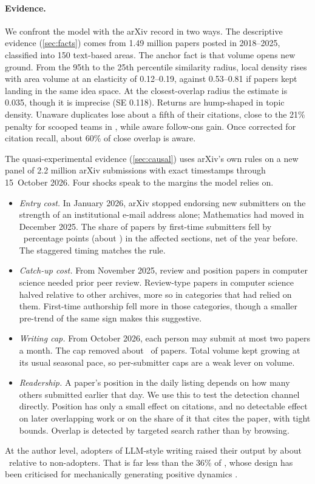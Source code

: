 \paragraph{Evidence.} We confront the model with the arXiv record in two ways.
The descriptive evidence (\cref{sec:facts}) comes from 1.49 million papers posted
in 2018--2025, classified into 150 text-based areas. The anchor fact is that volume
opens new ground. From the 95th to the 25th percentile similarity radius, local
density rises with area volume at an elasticity of 0.12--0.19, against 0.53--0.81
if papers kept landing in the same idea space. At the closest-overlap radius the
estimate is 0.035, though it is imprecise (SE 0.118). Returns are hump-shaped in
topic density. Unaware duplicates lose about a fifth of their citations, close to
the 21\% penalty for scooped teams in \citet{hillstein2025}, while aware
follow-ons gain. Once corrected for citation recall, about 60\% of close overlap
is aware.

The quasi-experimental evidence (\cref{sec:causal}) uses arXiv's own rules on a
new panel of 2.2 million arXiv submissions with exact timestamps through
15~October 2026. Four shocks speak to the margins the model relies on.
\begin{itemize}
\item \emph{Entry cost.} In January 2026, arXiv stopped endorsing new submitters
on the strength of an institutional e-mail address alone; Mathematics had moved
in December 2025. The share of papers by first-time submitters fell by
\empEndOther\ percentage points (about \empEndOtherRel) in the affected
sections, net of the year before. The staggered timing matches the rule.
\item \emph{Catch-up cost.} From November 2025, review and position papers in
computer science needed prior peer review. Review-type papers in computer
science halved relative to other archives, more so in categories that had
relied on them. First-time authorship fell more in those categories, though a
smaller pre-trend of the same sign makes this suggestive.
\item \emph{Writing cap.} From October 2026, each person may submit at most two
papers a month. The cap removed about \empCapRemoved\ of papers. Total volume
kept growing at its usual seasonal pace, so per-submitter caps are a weak lever
on volume.
\item \emph{Readership.} A paper's position in the daily listing depends on how
many others submitted earlier that day. We use this to test the
detection channel directly. Position has only a small effect on citations, and
no detectable effect on later overlapping work or on the share of it that cites
the paper, with tight bounds. Overlap is detected by targeted search rather than
by browsing.
\end{itemize}
At the author level, adopters of LLM-style writing raised their output by about
\empLLMallPct\ relative to non-adopters. That is far less than the 36\% of
\citet{kusumegietal2025}, whose design has been criticised for mechanically
generating positive dynamics \citep{renaultetal2026}.

